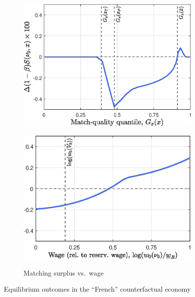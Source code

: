 \documentclass[12pt,letterpaper]{article} %
\theoremstyle{plain}
\theoremstyle{definition}
\begin{document}
\begin{figure}[!h]
\begin{subfigure}{0.475\textwidth}
			\includegraphics[width=\textwidth]{panel_c.eps}
			\label{fig:panel_d}
		\end{subfigure}
		\begin{subfigure}{0.475\textwidth}
			\centering
			\caption{Matching surplus vs.\ wage}
			\includegraphics[width=\textwidth]{panel_d.eps}
			\label{fig:panel_d}
		\end{subfigure}
		\caption{Equilibrium outcomes in the ``French'' counterfactual economy}
		\label{fig:eql_outcomes}

\end{figure}
\end{document}
